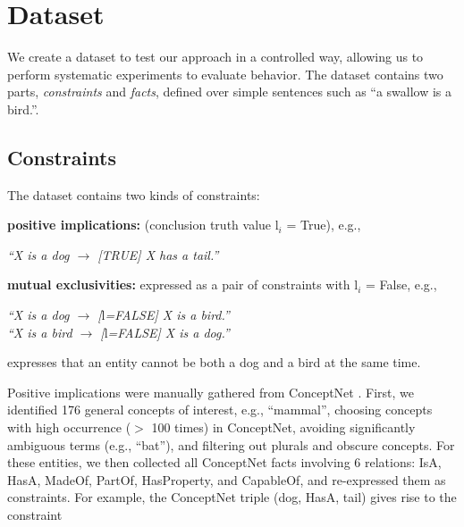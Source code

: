\documentclass[11pt]{article}
\newcommand{\nk}[1]{\textcolor{green}{Nora: #1}}
\newcommand{\red}[1]{\textcolor{red}{#1}}
\newenvironment{myquote}{                   %
  \parskip 0mm \begin{quoting}[vskip=0mm,leftmargin=2mm]}{
\end{quoting}}
\newenvironment{des}{                 %
     \parskip 0cm \begin{list}{}{\parsep 0cm \itemsep 0cm \topsep 0cm}}{
       \end{list}} %
\begin{document}
\section{Dataset \label{dataset}}


We create a dataset to test our approach in a controlled way, allowing us to perform systematic experiments to evaluate behavior.
The dataset contains two parts, {\it constraints} and {\it facts}, defined over simple sentences
such as ``a swallow is a bird.''.

\subsection{Constraints}

The dataset contains two kinds of constraints:
\begin{des}
\item[{\bf positive implications:}] (conclusion truth value $\textrm{l}_i$ = True), e.g.,
\begin{myquote}
{\it ``X is a dog $\rightarrow$ [TRUE] X has a tail.''}
\end{myquote}
\item[{\bf mutual exclusivities:}] expressed as a pair of constraints with $\textrm{l}_i$ = False, e.g.,
\begin{myquote}
{\it ``X is a dog $\rightarrow$ [$\textrm{l}$=FALSE] X is a bird.''} \\
{\it ``X is a bird $\rightarrow$ [$\textrm{l}$=FALSE] X is a dog.''}
\end{myquote}
expresses that an entity cannot be both a dog and a bird at the same time.

\end{des}
Positive implications were manually gathered from ConceptNet \cite{Speer2017ConceptNet5A}.
First, we identified 176 general concepts of interest, e.g., ``mammal'', choosing concepts
with high occurrence ($>$ 100 times) in ConceptNet, avoiding significantly ambiguous terms (e.g., ``bat''), and filtering out plurals and 
obscure concepts.
For these entities, we then collected all ConceptNet facts involving 6 relations: IsA, HasA, MadeOf, PartOf,
HasProperty, and CapableOf, and
re-expressed them as constraints. For example, the ConceptNet triple (dog, HasA, tail) gives rise to the constraint
\end{document}
